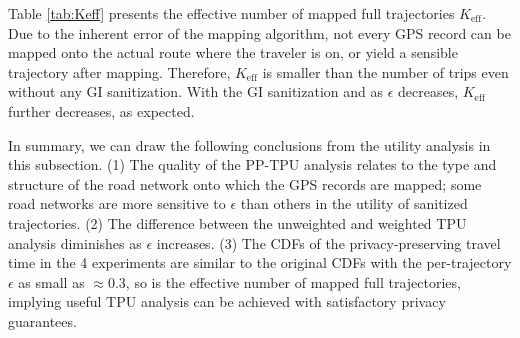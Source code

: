 \documentclass[10pt,journal,compsoc]{IEEEtran}
\begin{document}
Table \ref{tab:Keff} presents the effective number of mapped full trajectories $K_{\text{eff}}$.   Due to the inherent error of the mapping algorithm, not every GPS record can be mapped onto the actual route where the traveler is on, or yield a sensible trajectory after mapping. Therefore, $K_{\text{eff}}$ is smaller than the number of trips even without any GI sanitization. With the GI sanitization and as $\epsilon$ decreases, $K_{\text{eff}}$ further decreases, as expected.
\begin{table}[!htb]\vspace{-6pt}
\caption{Effective number of mapped full trajectories $K_{\text{eff}}$}\label{tab:Keff}\vspace{-6pt}
\vspace{-6pt}
\end{table}

In summary, we can draw the following conclusions from the utility analysis in this subsection. (1) The quality of the PP-TPU analysis relates to the type and structure of the road network onto which the GPS records are mapped; some road networks are more sensitive to $\epsilon$ than others in the utility of sanitized trajectories. (2) The difference between the unweighted and weighted TPU analysis diminishes as  $\epsilon$ increases. (3) The CDFs of the privacy-preserving travel time in the 4 experiments are similar to  the original CDFs with the per-trajectory $\epsilon$ as small as $\approx0.3$, so is the effective number of mapped full trajectories, implying useful TPU analysis can be achieved with satisfactory privacy guarantees. 
\end{document}
